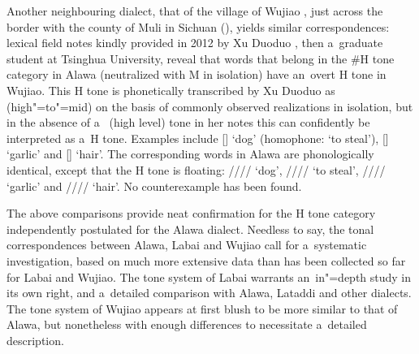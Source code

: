 
Another neighbouring dialect, that of the village of Wujiao , just across the border with
the county of Muli in Sichuan (), yields similar correspondences: lexical
field notes kindly provided in 2012 by Xu Duoduo , then a~graduate student at Tsinghua
University, reveal that words that belong in the \#H tone category in Alawa (neutralized with M in isolation) have
an~overt H tone in Wujiao. This H tone is phonetically transcribed by Xu Duoduo as  (high"=to"=mid)
on the basis of commonly observed realizations in isolation, but in the absence of a~ (high level)
tone in her notes this can confidently be interpreted as a~H tone. Examples include [] ‘dog’ (homophone: ‘to steal’), [] ‘garlic’ and [] ‘hair’. The corresponding words in Alawa are phonologically identical, except that the H tone is floating: //// ‘dog’, //// ‘to steal’, //// ‘garlic’ and //// ‘hair’. No {counterexample} has been found.

The above comparisons provide neat confirmation for the H tone category
independently postulated for the Alawa dialect. Needless to say, the tonal correspondences between
Alawa, Labai and Wujiao call for a~systematic investigation, based on much more extensive data
than has been collected so far for Labai and Wujiao. The tone system of Labai warrants an~in"=depth study in its own
right, and a~detailed comparison with Alawa, Lataddi \citep{dobbsetal2016} and other dialects. The tone system of Wujiao appears at first blush to
be more similar to that of Alawa, but nonetheless with enough differences to necessitate a~detailed description.


